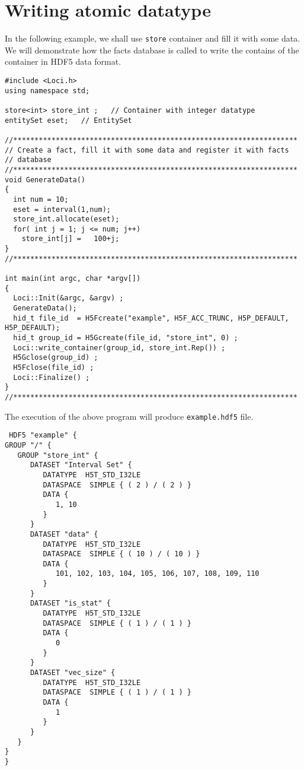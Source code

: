 \section { Writing atomic datatype }
In the following example, we shall use {\tt store} container and fill it with
some data. We will demonstrate how the facts database is called to write the
contains of the container in HDF5 data format.
\begin{verbatim}
#include <Loci.h>
using namespace std;

store<int> store_int ;   // Container with integer datatype
entitySet eset;   // EntitySet

//*******************************************************************
// Create a fact, fill it with some data and register it with facts
// database
//*******************************************************************
void GenerateData()
{
  int num = 10;
  eset = interval(1,num);
  store_int.allocate(eset);
  for( int j = 1; j <= num; j++) 
    store_int[j] =   100+j;
}
//*******************************************************************

int main(int argc, char *argv[])
{
  Loci::Init(&argc, &argv) ;
  GenerateData();
  hid_t file_id  = H5Fcreate("example", H5F_ACC_TRUNC, H5P_DEFAULT, H5P_DEFAULT);
  hid_t group_id = H5Gcreate(file_id, "store_int", 0) ;
  Loci::write_container(group_id, store_int.Rep()) ; 
  H5Gclose(group_id) ;
  H5Fclose(file_id) ;
  Loci::Finalize() ;
}
//*******************************************************************
\end{verbatim}
The execution of the above program will produce {\tt example.hdf5} file. 
\begin{verbatim}
 HDF5 "example" {
GROUP "/" {
   GROUP "store_int" {
      DATASET "Interval Set" {
         DATATYPE  H5T_STD_I32LE  
         DATASPACE  SIMPLE { ( 2 ) / ( 2 ) } 
         DATA {
            1, 10
         } 
      } 
      DATASET "data" {
         DATATYPE  H5T_STD_I32LE  
         DATASPACE  SIMPLE { ( 10 ) / ( 10 ) } 
         DATA {
            101, 102, 103, 104, 105, 106, 107, 108, 109, 110
         } 
      } 
      DATASET "is_stat" {
         DATATYPE  H5T_STD_I32LE  
         DATASPACE  SIMPLE { ( 1 ) / ( 1 ) } 
         DATA {
            0
         } 
      } 
      DATASET "vec_size" {
         DATATYPE  H5T_STD_I32LE  
         DATASPACE  SIMPLE { ( 1 ) / ( 1 ) } 
         DATA {
            1
         } 
      } 
   } 
} 
} 


\end{verbatim}
